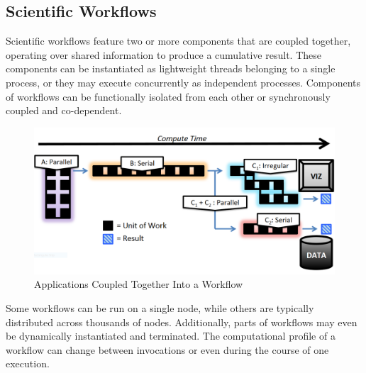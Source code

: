 \subsection{Scientific Workflows} %
%
Scientific workflows feature two or more components that are coupled
together, operating over shared information to produce a cumulative
result.
%
These components can be instantiated as lightweight threads belonging
to a single process, or they may execute concurrently as independent
processes.
%
Components of workflows can be functionally isolated from each
other or synchronously coupled and co-dependent.
%
\begin{figure}[h]
\centering
\includegraphics[width=\columnwidth]{images/workflow_example.png}
\caption{Applications Coupled Together Into a Workflow}
\label{fig_workflow_example}
\end{figure}
%
Some workflows can be run on a single node, while others are typically
distributed across thousands of nodes.
%
Additionally, parts of workflows may even be dynamically instantiated and
terminated.
%
The computational profile of a workflow can change between invocations
or even during the course of one execution.
%
%
%
%
%
%
%
%
%
%
%
%
